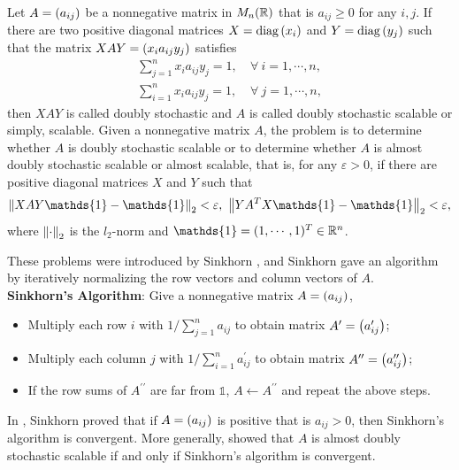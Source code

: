 \documentclass[suri,pdfbookmark]{engsuribt} %
\begin{document}
  Let $A = \left(a_{ij}\right)$ be a nonnegative matrix in $M_{n}(\mathbb{R})$ that is $a_{ij} \geqslant 0$ for any $i,j$. If there are two positive diagonal matrices $X= \operatorname{diag}\left(x_i\right)$ and $Y=\operatorname{diag}\left(y_j\right)$ such that the matrix $XAY = \left(x_ia_{ij}y_j\right)$ satisfies
  \begin{equation*}
    \begin{split}
      \sum_{j=1}^n x_ia_{ij}y_j = 1,&~\forall~i=1,\cdots,n,\\
      \sum_{i=1}^n x_ia_{ij}y_j = 1,&~\forall~j=1,\cdots,n,
    \end{split}
  \end{equation*}
  then $XAY$ is called doubly stochastic and $A$ is called doubly stochastic scalable or simply, scalable. Given a nonnegative matrix $A$, the problem is to determine whether $A$ is doubly stochastic scalable or to determine whether $A$ is almost doubly stochastic scalable or almost scalable, that is, for any $\varepsilon > 0$, if there are positive diagonal matrices $X$ and $Y$ such that
  \begin{equation*}
    \norm{XAY\mathds{1}-\mathds{1}}_2 < \varepsilon,~\norm{YA^TX\mathds{1}-\mathds{1}}_2 < \varepsilon,
  \end{equation*}
  where $\left\lVert\cdot\right\lVert_2$ is the $l_2$-norm and $\mathds{1} = (1,\cdots,1)^T \in \R^n$. 

  These problems were introduced by Sinkhorn \cite{key14}, and Sinkhorn gave an algorithm by iteratively normalizing the row vectors and column vectors of $A$. \vspace{0.5em}\\ 
  \textbf{Sinkhorn's Algorithm}: Give a nonnegative matrix $A = \left(a_{ij}\right)$,
  \begin{itemize}
    \item Multiply each row $i$ with $1/\sum_{j=1}^n a_{ij}$ to obtain matrix $A^{\prime} = \left(a^{\prime}_{ij}\right)$;
    \item Multiply each column $j$ with $1/\sum_{i=1}^n a^{\prime}_{ij}$ to obtain matrix $A^{\prime\prime} = \left(a^{\prime\prime}_{ij}\right)$;
    \item If the row sums of $A^{\prime\prime}$ are far from $\mathds{1}$, $A \leftarrow A^{\prime\prime}$ and repeat the above steps.
  \end{itemize}
  In \cite{key14}, Sinkhorn proved that if $A=\left(a_{ij}\right)$ is positive that is $a_{ij} > 0$, then Sinkhorn's algorithm is convergent. More generally, \cite{key17} showed that $A$ is almost doubly stochastic scalable if and only if Sinkhorn's algorithm is convergent.
\end{document}
